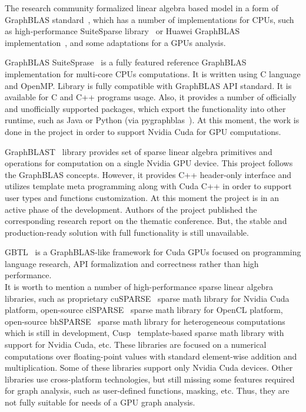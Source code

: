 The research community formalized linear algebra based model in a form of GraphBLAS standard~\cite{paper:graphblas_foundations}, which has a number of implementations for CPUs, such as high-performance SuiteSparse library~\cite{article:suite_sparse_for_graph_problems} or Huawei GraphBLAS implementation~\cite{article:hu_graphblas_impl}, and some adaptations for a GPUs analysis. 

GraphBLAS SuiteSprase~\cite{article:suite_sparse_for_graph_problems} is a fully featured reference GraphBLAS implementation for multi-core CPUs computations. It is written using C language and OpenMP. Library is fully compatible with GraphBLAS API standard. It is available for C and C++ programs usage. Also, it provides a number of officially and unofficially supported packages, which export the functionality into other runtime, such as Java or Python (via pygraphblas~\cite{net:pygraphblas}). At this moment, the work is done in the project in order to support Nvidia Cuda for GPU computations.

GraphBLAST~\cite{yang2019graphblast} library provides set of sparse linear algebra primitives and operations for computation on a single Nvidia GPU device. This project follows the GraphBLAS concepts. However, it provides C++ header-only interface and utilizes template meta programming along with Cuda C++ in order to support user types and functions customization. At this moment the project is in an active phase of the development. Authors of the project published the corresponding research report on the thematic conference. But, the stable and production-ready solution with full functionality is still unavailable.

GBTL~\cite{article:gbtl} is a GraphBLAS-like framework for Cuda GPUs focused on programming language research, API formalization and correctness rather than high performance.\\

It is worth to mention a number of high-performance sparse linear algebra libraries, such as proprietary cuSPARSE~\cite{net:cusparse_docs} sparse math library for Nvidia Cuda platform, open-source clSPARSE~\cite{article:clsparse} sparse math library for OpenCL platform, open-source bhSPARSE~\cite{article:bhsparse} sparse math library for heterogeneous computations which is still in development, Cusp~\cite{net:cusplibrary} template-based sparse math library with support for Nvidia Cuda, etc. These libraries are focused on a numerical computations over floating-point values with standard element-wise addition and multiplication. Some of these libraries support only Nvidia Cuda devices. Other libraries use cross-platform technologies, but still missing some features required for graph analysis, such as user-defined functions, masking, etc. Thus, they are not fully suitable for needs of a GPU graph analysis.

